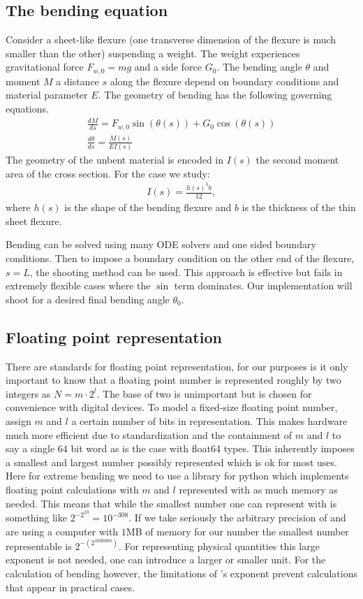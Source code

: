 \documentclass[12pt,reqno]{article}
\begin{document}
	\subsection{The bending equation}
	Consider a sheet-like flexure (one transverse dimension of the flexure is much smaller than the other) suspending a weight. The weight experiences gravitational force $F_{w,0} = mg$ and a side force $G_{0}$. The bending angle $\theta$ and moment $M$ a distance $s$ along the flexure depend on boundary conditions and material parameter $E$. The geometry of bending has the following governing equations.
	\begin{align}
		\frac{dM}{ds} = F_{w,0}\sin(\theta(s)) + G_{0} \cos(\theta(s))\\
		\frac{d\theta}{ds} = \frac{M(s)}{EI(s)}\label{eqn:dtds}
	\end{align}
	The geometry of the unbent material is encoded in $I(s)$ the second moment area of the cross section. For the case we study:
	\begin{align}
		I(s) = \frac{h(s)^{3}b}{12},\label{eqn:2ndmom}
	\end{align}
	where $h(s)$ is the shape of the bending flexure and $b$ is the thickness of the thin sheet flexure.
	
	Bending can be solved using many ODE solvers and one sided boundary conditions. Then to impose a boundary condition on the other end of the flexure, $s = L$, the shooting method can be used.  This approach is effective but fails in extremely flexible cases where the $\sin$ term dominates. Our implementation will shoot for a desired final bending angle $\theta_{0}$.
	\subsection{Floating point representation}
	There are standards for floating point representation, for our purposes is it only important to know that a floating point number is represented roughly by two integers as $N = m \cdot 2^{l}$. The base of two is unimportant but is chosen for convenience with digital devices. To model a fixed-size floating point number, assign $m$ and $l$ a certain number of bits in representation. This makes hardware much more efficient due to standardization and the containment of $m$ and $l$ to say a single $64$ bit word as is the case with float64 types. This inherently imposes a smallest and largest number possibly represented which is ok for most uses. Here for extreme bending we need to use a library  for python which implements floating point calculations with $m$ and $l$ represented with as much memory as needed. This means that while the smallest number one can represent with  is something like $2^{-{2^{10}}} = 10^{-308}$. If we take seriously the arbitrary precision of  and are using a computer with $1$MB of memory for our number the smallest number representable is $2^{-(2^{1000000})}$. For representing physical quantities this large exponent is not needed, one can introduce a larger or smaller unit. For the calculation of bending however, the limitations of 's exponent prevent calculations that appear in practical cases. 
\end{document}
